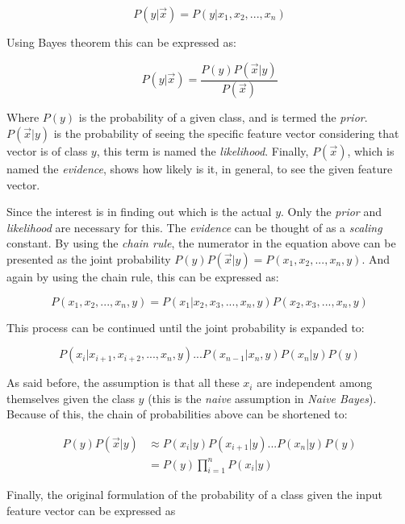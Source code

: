\documentclass[epsfig,a4paper,11pt,titlepage,twoside,openany]{book}
\begin{document}
\begin{equation*}
    P(y | \vec{x} ) = P(y | x_1, x_2, ..., x_n)
\end{equation*}

Using Bayes theorem this can be expressed as:

\begin{equation*}
    P(y | \vec{x}) = \frac{P(y)P(\vec{x} | y)}{P(\vec{x})}
\end{equation*}

Where $P(y)$ is the probability of a given class, and is termed the \textit{prior}. $P(\vec{x} | y)$ is the probability of seeing the specific feature vector considering that vector is of class $y$, this term is named the \textit{likelihood}. Finally, $P(\vec{x})$, which is named the \textit{evidence}, shows how likely is it, in general, to see the given feature vector. 

Since the interest is in finding out which is the actual $y$. Only the \textit{prior} and \textit{likelihood} are necessary for this. The \textit{evidence} can be thought of as a \textit{scaling} constant. By using the \textit{chain rule}, the numerator in the equation above can be presented as the joint probability $P(y)P(\vec{x} | y) = P(x_1, x_2, ..., x_n, y)$. And again by using the chain rule, this can be expressed as:

\begin{equation*}
    P(x_1, x_2, ..., x_n, y) = P(x_1 | x_2, x_3, ..., x_n, y) P(x_2,x_3,...,x_n, y)
\end{equation*}

This process can be continued until the joint probability is expanded to:

\begin{equation*}
    P(x_i | x_{i+1}, x_{i+2}, ..., x_n, y) ... P(x_{n-1}| x_n, y) P(x_n | y) P(y)
\end{equation*}

As said before, the assumption is that all these $x_i$ are independent among themselves given the class $y$ (this is the \textit{naive} assumption in \textit{Naive Bayes}). Because of this, the chain of probabilities above can be shortened to:

\begin{align*}
    P(y)P(\vec{x} | y) & \approx P(x_i | y) P(x_{i+1} | y) ... P(x_n | y) P(y) \\
                           &= P(y) \prod_{i=1}^n P(x_i | y)
\end{align*}

Finally, the original formulation of the probability of a class given the input feature vector can be expressed as
\end{document}
